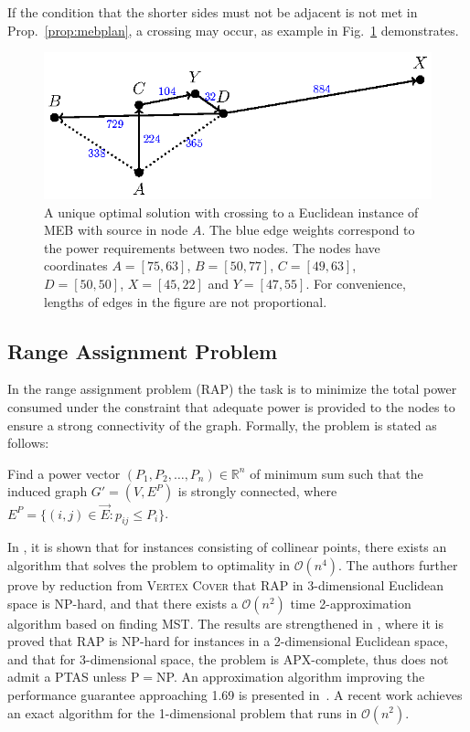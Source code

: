 If the condition that the shorter sides must not be adjacent is not met in Prop.~\ref{prop:mebplan}, a crossing may occur, as example in Fig.~\ref{fig:mebnonplan} demonstrates.
\begin{figure}[htb!]
  \centering
  \includegraphics[scale=1.4]{figurer/mebnonplanar.eps}
  \caption{A unique optimal solution with crossing to a Euclidean instance of  MEB with source in node $A$.
  The blue edge weights correspond to the power requirements between two nodes. 
  The nodes have coordinates $A=[75,63]$, $B=[50,77]$, $C=[49,63]$, $D=[50,50]$, $X=[45,22]$ and $Y=[47,55]$.
  For convenience, lengths of edges in the figure are not proportional.}
  \label{fig:mebnonplan}
\end{figure}

\subsection{Range Assignment Problem}

In the range assignment problem (RAP) the task is to minimize the total power consumed under the constraint 
that adequate power is provided to the nodes to ensure a strong connectivity of the graph.
Formally, the problem is stated as follows:
\begin{problem}
Find a power vector $(P_1,P_2,\dots,P_n)\in\mathbb{R}^n$ of minimum sum such that the induced graph $G'=(V,E^P)$ is strongly connected, 
where $E^P=\{(i,j)\in \vec{E}: p_{ij}\leq P_i\}$.
\end{problem}
In \cite{kirousis00}, it is shown that for instances consisting of collinear points, there exists an algorithm that solves the problem to optimality in $\mathcal{O}(n^4)$.
The authors further prove by reduction from \textsc{Vertex Cover} that RAP in 3-dimensional Euclidean space is NP-hard,
and that there exists a $\mathcal{O}(n^2)$ time 2-approximation algorithm based on finding MST.
The results are strengthened in \cite{clementi99}, where it is proved that RAP is NP-hard for instances in a 2-dimensional Euclidean space, 
and that for 3-dimensional space, the problem is APX-complete, thus does not admit a PTAS unless P$=$NP.
An approximation algorithm improving the performance guarantee approaching 1.69 is presented in~\cite{calinescu02}.
A recent work \cite{carmi15} achieves an exact algorithm for the 1-dimensional problem that runs in $\mathcal{O}(n^2)$.

